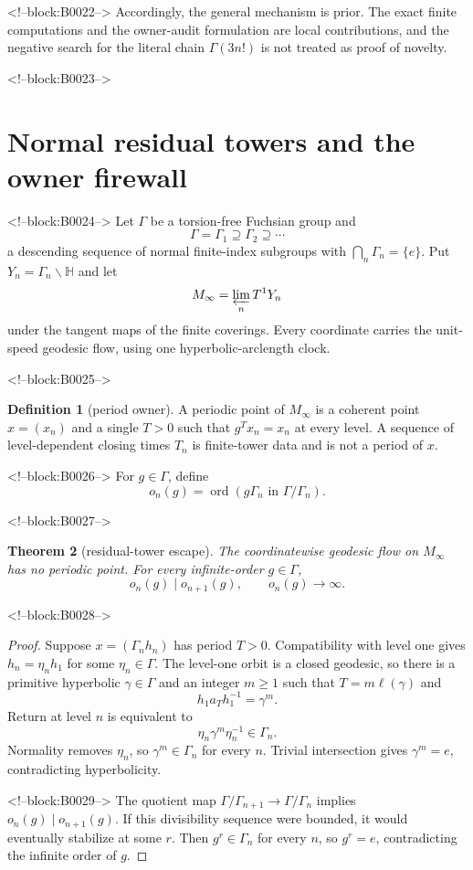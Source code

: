 \documentclass[11pt]{article}
\newtheorem{theorem}{Theorem}[section]
\theoremstyle{definition}
\newtheorem{definition}[theorem]{Definition}
\theoremstyle{remark}
\newcommand{\HH}{\mathbb H}
\newcommand{\ord}{\operatorname{ord}}
\begin{document}
<!--block:B0022-->
Accordingly, the general mechanism is prior. The exact finite computations and the owner-audit formulation are local contributions, and the negative search for the literal chain $\Gamma(3n!)$ is not treated as proof of novelty.

<!--block:B0023-->
\section{Normal residual towers and the owner firewall}

<!--block:B0024-->
Let $\Gamma$ be a torsion-free Fuchsian group and
\[
\Gamma=\Gamma_1\supseteq\Gamma_2\supseteq\cdots
\]
a descending sequence of normal finite-index subgroups with
$\bigcap_n\Gamma_n=\{e\}$. Put $Y_n=\Gamma_n\backslash\HH$ and let
\[
M_\infty=\varprojlim_n T^1Y_n
\]
under the tangent maps of the finite coverings. Every coordinate carries the unit-speed geodesic flow, using one hyperbolic-arclength clock.

<!--block:B0025-->
\begin{definition}[period owner]
A periodic point of $M_\infty$ is a coherent point $x=(x_n)$ and a single $T>0$ such that $g^T x_n=x_n$ at every level. A sequence of level-dependent closing times $T_n$ is finite-tower data and is not a period of $x$.
\end{definition}

<!--block:B0026-->
For $g\in\Gamma$, define
\[
o_n(g)=\ord(g\Gamma_n\text{ in }\Gamma/\Gamma_n).
\]

<!--block:B0027-->
\begin{theorem}[residual-tower escape]\label{thm:residual}
The coordinatewise geodesic flow on $M_\infty$ has no periodic point. For every infinite-order $g\in\Gamma$,
\[
o_n(g)\mid o_{n+1}(g),
\qquad
o_n(g)\longrightarrow\infty.
\]
\end{theorem}

<!--block:B0028-->
\begin{proof}
Suppose $x=(\Gamma_nh_n)$ has period $T>0$. Compatibility with level one gives $h_n=\eta_nh_1$ for some $\eta_n\in\Gamma$. The level-one orbit is a closed geodesic, so there is a primitive hyperbolic $\gamma\in\Gamma$ and an integer $m\geq1$ such that $T=m\ell(\gamma)$ and
\[
h_1a_Th_1^{-1}=\gamma^m.
\]
Return at level $n$ is equivalent to
\[
\eta_n\gamma^m\eta_n^{-1}\in\Gamma_n.
\]
Normality removes $\eta_n$, so $\gamma^m\in\Gamma_n$ for every $n$. Trivial intersection gives $\gamma^m=e$, contradicting hyperbolicity.

<!--block:B0029-->
The quotient map $\Gamma/\Gamma_{n+1}\to\Gamma/\Gamma_n$ implies $o_n(g)\mid o_{n+1}(g)$. If this divisibility sequence were bounded, it would eventually stabilize at some $r$. Then $g^r\in\Gamma_n$ for every $n$, so $g^r=e$, contradicting the infinite order of $g$.
\end{proof}
\end{document}

